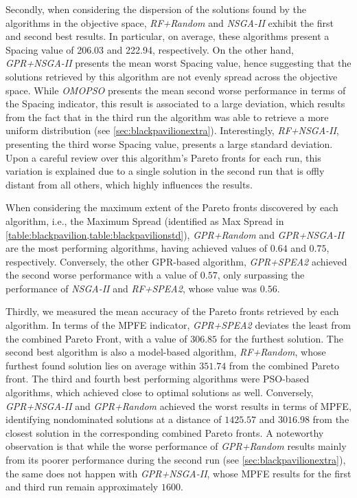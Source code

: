 Secondly, when considering the dispersion of the solutions found by the algorithms in the objective space, \textit{RF+Random} and \textit{\ac{NSGA-II}} exhibit the first and second best results. In particular, on average, these algorithms present a Spacing value of 206.03 and 222.94, respectively. On the other hand, \textit{GPR+NSGA-II} presents the mean worst Spacing value, hence suggesting that the solutions retrieved by this algorithm are not evenly spread across the objective space. While \textit{OMOPSO} presents the mean second worse performance in terms of the Spacing indicator, this result is associated to a large deviation, which results from the fact that in the third run the algorithm was able to retrieve a more uniform distribution (see \cref{sec:blackpavilionextra}). Interestingly, \textit{RF+NSGA-II}, presenting the third worse Spacing value, presents a large standard deviation. Upon a careful review over this algorithm's Pareto fronts for each run, this variation is explained due to a single solution in the second run that is offly distant from all others, which highly influences the results. 

When considering the maximum extent of the Pareto fronts discovered by each algorithm, i.e., the Maximum Spread (identified as Max Spread in \cref{table:blackpavilion,table:blackpavilionstd}), \textit{GPR+Random} and \textit{GPR+NSGA-II} are the most performing algorithms, having achieved values of $0.64$ and $0.75$, respectively. Conversely, the other GPR-based algorithm, \textit{GPR+SPEA2} achieved the second worse performance with a value of $0.57$, only surpassing the performance of \textit{NSGA-II} and \textit{RF+SPEA2}, whose value was $0.56$. 

Thirdly, we measured the mean accuracy of the Pareto fronts retrieved by each algorithm. In terms of the \ac{MPFE} indicator, \textit{GPR+SPEA2} deviates the least from the combined Pareto Front, with a value of $306.85$ for the furthest solution. The second best algorithm is also a model-based algorithm, \textit{RF+Random}, whose furthest found solution lies on average within $351.74$ from the combined Pareto front.  The third and fourth best performing algorithms were \ac{PSO}-based algorithms, which achieved close to optimal solutions as well. Conversely, \textit{GPR+NSGA-II} and \textit{GPR+Random} achieved the worst results in terms of \ac{MPFE}, identifying nondominated solutions at a distance of $1425.57$ and $3016.98$ from the closest solution in the corresponding combined Pareto fronts. A noteworthy observation is that while the worse performance of \textit{GPR+Random} results mainly from its poorer performance during the second run (see \cref{sec:blackpavilionextra}), the same does not happen with \textit{GPR+NSGA-II}, whose \ac{MPFE} results for the first and third run remain approximately $1600$. 

